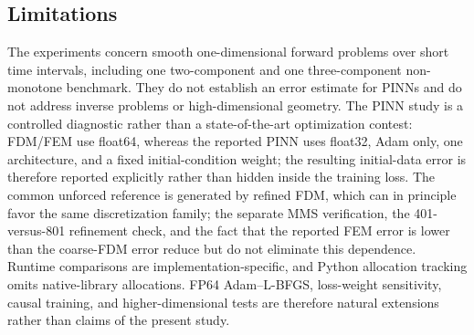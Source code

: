 \subsection{Limitations}

The experiments concern smooth one-dimensional forward problems over short time intervals, including one two-component and one three-component non-monotone benchmark. They do not establish an error estimate for PINNs and do not address inverse problems or high-dimensional geometry. The PINN study is a controlled diagnostic rather than a state-of-the-art optimization contest: FDM/FEM use float64, whereas the reported PINN uses float32, Adam only, one architecture, and a fixed initial-condition weight; the resulting initial-data error is therefore reported explicitly rather than hidden inside the training loss. The common unforced reference is generated by refined FDM, which can in principle favor the same discretization family; the separate MMS verification, the 401-versus-801 refinement check, and the fact that the reported FEM error is lower than the coarse-FDM error reduce but do not eliminate this dependence. Runtime comparisons are implementation-specific, and Python allocation tracking omits native-library allocations. FP64 Adam--L-BFGS, loss-weight sensitivity, causal training, and higher-dimensional tests are therefore natural extensions rather than claims of the present study.
